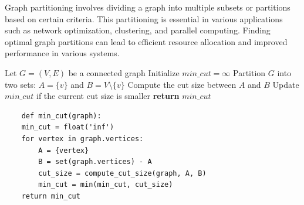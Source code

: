 \documentclass[12pt]{book} %
\begin{document}
Graph partitioning involves dividing a graph into multiple subsets or partitions based on certain criteria. This partitioning is essential in various applications such as network optimization, clustering, and parallel computing. Finding optimal graph partitions can lead to efficient resource allocation and improved performance in various systems.
\FloatBarrier
\begin{algorithm}\label{algo:min_cut}
\caption{Minimum Cut Algorithm}
\begin{algorithmic}[1]
\State Let $G=(V,E)$ be a connected graph
\State Initialize $min\_cut = \infty$
    \State Partition $G$ into two sets: $A = \{v\}$ and $B = V \setminus \{v\}$
    \State Compute the cut size between $A$ and $B$
    \State Update $min\_cut$ if the current cut size is smaller
\EndFor
\State \textbf{return} $min\_cut$
\end{algorithmic}
\end{algorithm}
\FloatBarrier
\begin{lstlisting}
    def min_cut(graph):
    min_cut = float('inf')
    for vertex in graph.vertices:
        A = {vertex}
        B = set(graph.vertices) - A
        cut_size = compute_cut_size(graph, A, B)
        min_cut = min(min_cut, cut_size)
    return min_cut
\end{lstlisting}
\end{document}
